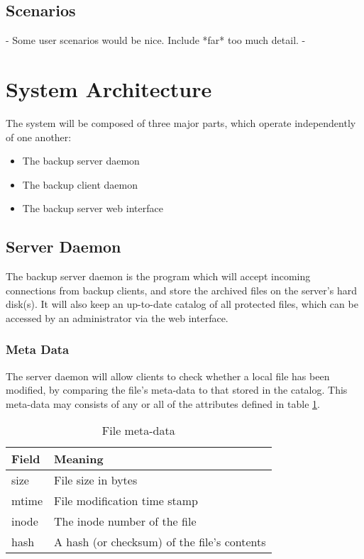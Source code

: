 \subsection{Scenarios}

 - Some user scenarios would be nice. Include *far* too much detail. -

\section{System Architecture}

The system will be composed of three major parts, which operate independently
of one another:

\begin{itemize}
    \item The backup server daemon
    \item The backup client daemon
    \item The backup server web interface
\end{itemize}

\subsection{Server Daemon}

The backup server daemon is the program which will accept incoming connections
from backup clients, and store the archived files on the server's hard disk(s).
It will also keep an up-to-date catalog of all protected files, which can be
accessed by an administrator via the web interface.

\subsubsection{Meta Data}

The server daemon will allow clients to check whether a local file has been
modified, by comparing the file's meta-data to that stored in the catalog. This
meta-data may consists of any or all of the attributes defined in table
\ref{tab:meta-data}.

\begin{table}[h]
    \centering
    \begin{tabular}{| l | l |} \hline
        Field       & Meaning                                       \\ \hline
        size        & File size in bytes                            \\ \hline
        mtime       & File modification time stamp                  \\ \hline
        inode       & The inode number of the file                  \\ \hline
        hash        & A hash (or checksum) of the file's contents   \\ \hline
    \end{tabular}
    \caption{File meta-data}
    \label{tab:meta-data}
\end{table}

